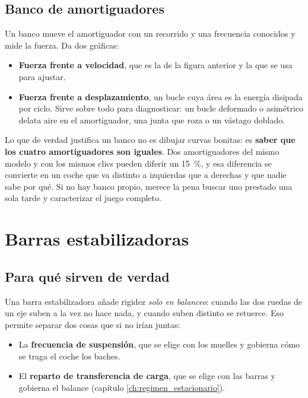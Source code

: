 \subsection{Banco de amortiguadores}

Un banco mueve el amortiguador con un recorrido y una frecuencia conocidos y
mide la fuerza. Da dos gráficas:

\begin{itemize}
  \item \textbf{Fuerza frente a velocidad}, que es la de la figura anterior y la
        que se usa para ajustar.
  \item \textbf{Fuerza frente a desplazamiento}, un bucle cuya área es la
        energía disipada por ciclo. Sirve sobre todo para diagnosticar: un
        bucle deformado o asimétrico delata aire en el amortiguador, una junta
        que roza o un vástago doblado.
\end{itemize}

\begin{clave}
Lo que de verdad justifica un banco no es dibujar curvas bonitas: es
\textbf{saber que los cuatro amortiguadores son iguales}. Dos amortiguadores del
mismo modelo y con los mismos clics pueden diferir un \SI{15}{\percent}, y esa
diferencia se convierte en un coche que va distinto a izquierdas que a derechas
y que nadie sabe por qué. Si no hay banco propio, merece la pena buscar uno
prestado una sola tarde y caracterizar el juego completo.
\end{clave}

\section{Barras estabilizadoras}
\label{sec:muelles_amortiguadores:04}

\subsection{Para qué sirven de verdad}

Una barra estabilizadora añade rigidez \emph{solo en balanceo}: cuando las dos
ruedas de un eje suben a la vez no hace nada, y cuando suben distinto se
retuerce. Eso permite separar dos cosas que si no irían juntas:

\begin{itemize}
  \item La \textbf{frecuencia de suspensión}, que se elige con los muelles y
        gobierna cómo se traga el coche los baches.
  \item El \textbf{reparto de transferencia de carga}, que se elige con las
        barras y gobierna el balance (capítulo \ref{ch:regimen_estacionario}).
\end{itemize}

